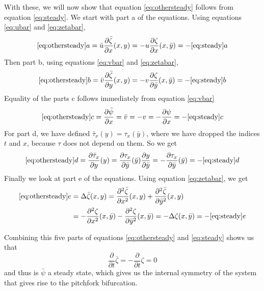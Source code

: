 With these, we will now show that equation \ref{eq:othersteady} follows from equation \ref{eq:steady}.
We start with part a of the equations. Using equations \ref{eq:ubar} and \ref{eq:zetabar},
\begin{equation*}
\ref{eq:othersteady} a=\bar u\frac{\partial\bar{\zeta}}{\partial x} (x,y) =-u \frac{\partial\zeta}{\partial x} (x,\bar y)=-\ref{eq:steady}a
\end{equation*}
Then part b, using equations \ref{eq:vbar} and \ref{eq:zetabar},
\begin{equation*}
\ref{eq:othersteady}b=\bar{v}\frac{\partial\bar{\zeta}}{\partial y} (x,y) =-v \frac{\partial\zeta}{\partial \bar y} (x,\bar y)=-\ref{eq:steady}b
\end{equation*}
Equality of the parts c follows immediately from equation \ref{eq:vbar}
$$\ref{eq:othersteady}c=\frac{\partial \bar{\psi}}{\partial x}=\bar{v}=-v=-\frac{\partial \psi}{\partial x}=-\ref{eq:steady}c$$
For part d, we have defined $\bar{\tau}_x(y)=\tau_x(\bar y)$, where we have dropped the indices $t$ and $x$, because $\tau$ does not depend on them. So we get
$$\ref{eq:othersteady}d=\frac{\partial \bar \tau_x}{\partial y}(y)=\frac{\partial \tau_x}{\partial \bar y}(\bar y)\frac{\partial y}{\partial \bar y}=-\frac{\partial \tau_x}{\partial \bar y}(\bar y)=-\ref{eq:steady}d$$
Finally we look at part e of the equations. Using equation \ref{eq:zetabar}, we get
\begin{align*}
\ref{eq:othersteady}e& =\Delta \bar{\zeta}(x,y)
=\frac{\partial^2\bar{\zeta}}{\partial x^2}(x, y)+\frac{\partial^2\bar{\zeta}}{\partial \bar y^2}(x, y) \\
&=-\frac{\partial^2\zeta}{\partial x^2}(x,\bar y)-\frac{\partial^2\zeta}{\partial \bar y^2}(x,\bar y)=-\Delta\zeta(x,\bar y)=-\ref{eq:steady} e
\end{align*}

Combining this five parts of equations \ref{eq:othersteady} and \ref{eq:steady} shows us that
$$\frac{\partial}{\partial t}\bar{\zeta}=-\frac{\partial}{\partial t}\zeta=0$$ and thus is $\bar{\psi}$ a steady state, which gives us the internal symmetry of the system that gives rise to the pitchfork bifurcation.



